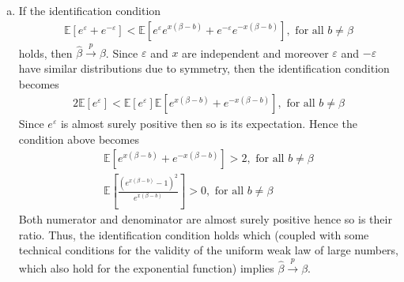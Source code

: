 \documentclass[a4paper]{article}
\newcommand{\expect}{\mathbb{E}}
\begin{document}
\begin{enumerate}[a)]
	\item If the identification condition
	\begin{align*}
	\expect[e^{\varepsilon} + e^{-\varepsilon}] < \expect[e^{\varepsilon}e^{x(\beta-b)} + e^{-\varepsilon}e^{-x(\beta - b)}], \text{ for all }b \neq \beta
	\end{align*}
	holds, then $\hat{\beta} \overset{p}{\to} \beta$. Since $\varepsilon$ and $x$ are independent and moreover $\varepsilon$ and $-\varepsilon$ have similar distributions due to symmetry, then the identification condition becomes
	\begin{align*}
	2 \expect[e^{\varepsilon}] < \expect[e^{\varepsilon}] \expect[e^{x(\beta - b)} + e^{-x(\beta - b)}], \text{ for all }b \neq \beta
	\end{align*}
	Since $e^{\varepsilon}$ is almost surely positive then so is its expectation. Hence the condition above becomes
	\begin{align*}
	\expect[e^{x(\beta - b)} + e^{-x(\beta - b)}] > 2, \text{ for all }b \neq \beta\\
	\expect\left[\frac{(e^{x(\beta-b)} - 1)^2}{e^{x(\beta - b)}}\right] > 0, \text{ for all }b \neq \beta
	\end{align*}
	Both numerator and denominator are almost surely positive hence so is their ratio. Thus, the identification condition holds which (coupled with some technical conditions for the validity of the uniform weak law of large numbers, which also hold for the exponential function) implies $\hat{\beta} \overset{p}{\to} \beta$. 
	
	
	

\end{enumerate}
\end{document}

